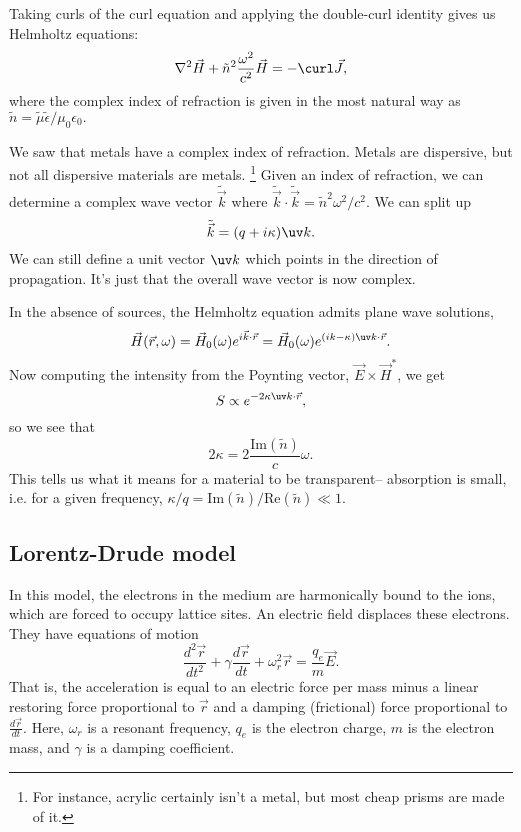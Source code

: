 Taking curls of the curl equation and applying the double-curl identity gives us Helmholtz equations:
\begin{equation}
    \nabla^2 \vec H + \tilde n^2 \frac{\omega^2}{c^2} \vec H = -\curl \vec J,
\end{equation}
where the complex index of refraction is given in the most natural way as $\tilde n = \tilde \mu \tilde \epsilon/\mu_0 \epsilon_0.$

We saw that metals have a complex index of refraction. Metals are dispersive, but not all dispersive materials are metals.%
    \footnote{For instance, acrylic certainly isn't a metal, but most cheap prisms are made of it.}
Given an index of refraction, we can determine a complex wave vector $\tilde{\vec k}$ where $\tilde{\vec k} \cdot \tilde{\vec k}=\tilde n^2 \omega^2/c^2$. We can split up
\begin{equation}
    \tilde{\vec k} = (q+i\kappa)\uv k.
\end{equation}
We can still define a unit vector $\uv k$ which points in the direction of propagation. It's just that the overall wave vector is now complex.

In the absence of sources, the Helmholtz equation admits plane wave solutions,
\begin{equation}
    \vec H(\vec r, \omega) =\vec H_0(\omega) e^{i\vec k \cdot \vec r} = \vec H_0(\omega) e^{(ik-\kappa)\uv k\cdot \vec r}.
\end{equation}
Now computing the intensity from the Poynting vector, $\vec E\times \vec H^*$, we get
\begin{equation}
    S \propto e^{-2\kappa \uv k \cdot \vec r},
\end{equation}
so we see that
\begin{equation}
    2\kappa = 2 \frac{\text{Im}(\tilde n)}{c}\omega.
\end{equation}
This tells us what it means for a material to be transparent-- absorption is small, i.e. for a given frequency, $\kappa/q = \text{Im}(\tilde n)/\text{Re}(\tilde n)\ll 1$.

\subsection*{Lorentz-Drude model}
In this model, the electrons in the medium are harmonically bound to the ions, which are forced to occupy lattice sites. An electric field displaces these electrons. They have equations of motion
\begin{equation}
    \frac{d^2\vec r}{dt^2} + \gamma \frac{d\vec r}{dt} + \omega_r^2 \vec r = \frac{q_e}{m}\vec E.
\end{equation}
That is, the acceleration is equal to an electric force per mass minus a linear restoring force proportional to $\vec r$ and a damping (frictional) force proportional to $\frac{d\vec r}{dt}$. Here, $\omega_r$ is a resonant frequency, $q_e$ is the electron charge, $m$ is the electron mass, and $\gamma$ is a damping coefficient.

